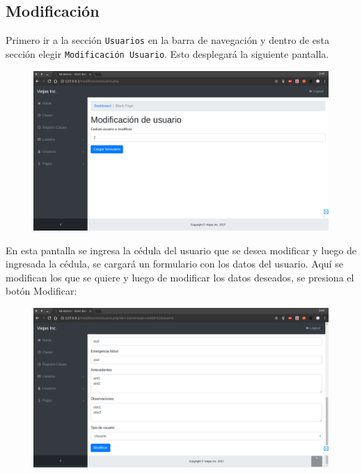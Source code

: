 \documentclass[a4paper, 12pt, spanish]{report}
\begin{document}
\subsection{Modificación}
\par Primero ir a la sección \verb|Usuarios| en la barra de navegación y dentro de esta sección elegir \verb|Modificación Usuario|. Esto desplegará la siguiente pantalla.
\begin{figure}[H]
	\centering
	\includegraphics[width=\linewidth]{imagenes/us_mod_carg}
	\label{fig:usmodcarg}
\end{figure}
\par En esta pantalla se ingresa la cédula del usuario que se desea modificar y luego de ingresada la cédula, se cargará un formulario con los datos del usuario. Aquí se modifican los que se quiere y luego de modificar los datos deseados, se presiona el botón Modificar:
\begin{figure}[H]
	\centering
	\includegraphics[width=\linewidth]{imagenes/us_mod_mod}
	\label{fig:usmodmod}
\end{figure}
\end{document}
